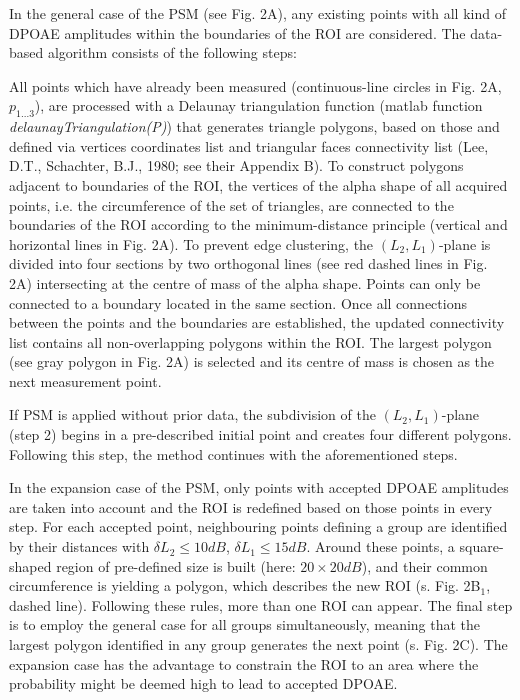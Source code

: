 \documentclass[journal,twoside,web]{ieeecolor2}
\begin{document}
In the general case of the PSM (see Fig. 2A), any existing points with all kind of DPOAE amplitudes within the boundaries of the ROI are considered. The data-based algorithm consists of the following steps:
\begin{algorithmic}[1]
\STATE All points which have already been measured (continuous-line circles in Fig. 2A, $p_{1...3}$), are processed with a Delaunay triangulation function (matlab function \textit{delaunayTriangulation(P)}) that generates triangle polygons, based on those and defined via vertices coordinates list and triangular faces  connectivity list (Lee, D.T., Schachter, B.J., 1980; see their Appendix B).
\STATE To construct polygons adjacent to boundaries of the ROI, the vertices of the alpha shape of all acquired points, i.e. the circumference of the set of triangles, are connected to the boundaries of the ROI according to the minimum-distance principle (vertical and horizontal lines in Fig. 2A). To prevent edge clustering, the $(L_2, L_1)$-plane is divided into four sections by two orthogonal lines (see red dashed lines in Fig. 2A) intersecting at the centre of mass of the alpha shape. Points can only be connected to a boundary located in the same section.
\STATE Once all connections between the points and the boundaries are established, the updated connectivity list contains all non-overlapping polygons within the ROI. The largest polygon (see gray polygon in Fig. 2A) is selected and its centre of mass is chosen as the next measurement point.
\end{algorithmic} 

If PSM is applied without prior data, the subdivision of the $(L_2, L_1)$-plane (step 2) begins in a pre-described initial point and creates four different polygons. Following this step, the method continues with the aforementioned steps.

In the expansion case of the PSM, only points with accepted DPOAE amplitudes are taken into account and the ROI is redefined based on those points in every step. For each accepted point, neighbouring points defining a group are identified by their distances with $\delta L_2 \le 10 dB$, $\delta L_1 \le 15 dB$. Around these points, a square-shaped region of pre-defined size is built (here: $20 \times 20 dB$), and their common circumference is yielding a polygon, which describes the new ROI (s. Fig. 2B$_1$, dashed line). Following these rules, more than one ROI can appear. The final step is to employ the general case for all groups simultaneously, meaning that the largest polygon identified in any group generates the next point (s. Fig. 2C). The expansion case has the advantage to constrain the ROI to an area where the probability might be deemed high to lead to accepted DPOAE.
\end{document}
